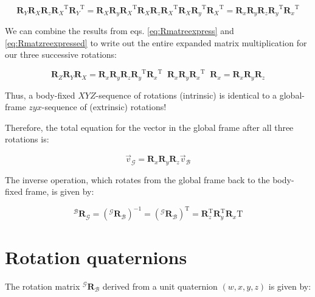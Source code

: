 \documentclass{article}
\begin{document}
\begin{equation}
    \mathbf{R}_Y \mathbf{R}_X \mathbf{R}_z {\mathbf{R}_X}^\mathrm{T} {\mathbf{R}_Y}^\mathrm{T} = \mathbf{R}_X \mathbf{R}_y {\mathbf{R}_X}^\mathrm{T} \mathbf{R}_X \mathbf{R}_z {\mathbf{R}_X}^\mathrm{T} \mathbf{R}_X {\mathbf{R}_y}^\mathrm{T} {\mathbf{R}_X}^\mathrm{T} = \mathbf{R}_x \mathbf{R}_y  \mathbf{R}_z {\mathbf{R}_y}^\mathrm{T} {\mathbf{R}_x}^\mathrm{T} 
    \label{eq:Rmatzreexpressed}
\end{equation}

We can combine the results from eqs.  \ref{eq:Rmatreexpress} and \ref{eq:Rmatzreexpressed} to write out the entire expanded matrix multiplication for our three successive rotations:

\begin{equation}
    \mathbf{R}_Z \mathbf{R}_Y \mathbf{R}_X  = \mathbf{R}_x \mathbf{R}_y  \mathbf{R}_z {\mathbf{R}_y}^\mathrm{T} {\mathbf{R}_x}^\mathrm{T} \; \;  \mathbf{R}_x \mathbf{R}_y {\mathbf{R}_x}^\mathrm{T} \; \; \mathbf{R}_x = \mathbf{R}_x \mathbf{R}_y  \mathbf{R}_z 
\end{equation}

Thus, a body-fixed \( XYZ \)-sequence of rotations (intrinsic) is identical to a global-frame \(zyx\)-sequence of (extrinsic) rotations!

Therefore, the total equation for the vector in the global frame after all three rotations is:

\begin{equation}
\vec{v}_{\mathcal{G}} = \mathbf{R}_x \mathbf{R}_y \mathbf{R}_z \vec{v}_{\mathcal{B}}
\end{equation}


The inverse operation, which rotates from the global frame back to the body-fixed frame, is given by:

\begin{equation}
{}^{\mathcal{B}} \mathbf{R}_{\mathcal{G}} = ({}^{\mathcal{G}} \mathbf{R}_{\mathcal{B}})^{-1} = ({}^{\mathcal{G}} \mathbf{R}_{\mathcal{B}})^\mathrm{T} = \mathbf{R}_z^\mathrm{T} \mathbf{R}_y^\mathrm{T} \mathbf{R}_x\mathrm{T}
\end{equation}


\section{Rotation quaternions}
\label{sec:quaternions}


The rotation matrix \( {}^{\mathcal{G}} \mathbf{R}_{\mathcal{B}} \) derived from a unit quaternion \( (w, x, y, z) \) is given by:
\end{document}
